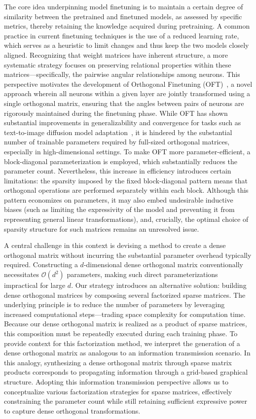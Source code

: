 The core idea underpinning model finetuning is to maintain a certain degree of similarity between the pretrained and finetuned models, as assessed by specific metrics, thereby retaining the knowledge acquired during pretraining. A common practice in current finetuning techniques is the use of a reduced learning rate, which serves as a heuristic to limit changes and thus keep the two models closely aligned. Recognizing that weight matrices have inherent structure, a more systematic strategy focuses on preserving relational properties within these matrices—specifically, the pairwise angular relationships among neurons. This perspective motivates the development of Orthogonal Finetuning (OFT)~\cite{qiu2023controlling}, a novel approach wherein all neurons within a given layer are jointly transformed using a single orthogonal matrix, ensuring that the angles between pairs of neurons are rigorously maintained during the finetuning phase. While OFT has shown substantial improvements in generalizability and convergence for tasks such as text-to-image diffusion model adaptation~\cite{qiu2023controlling}, it is hindered by the substantial number of trainable parameters required by full-sized orthogonal matrices, especially in high-dimensional settings. To make OFT more parameter-efficient, a block-diagonal parameterization is employed, which substantially reduces the parameter count. Nevertheless, this increase in efficiency introduces certain limitations: the sparsity imposed by the fixed block-diagonal pattern means that orthogonal operations are performed separately within each block. Although this pattern economizes on parameters, it may also embed undesirable inductive biases (such as limiting the expressivity of the model and preventing it from representing general linear transformations), and, crucially, the optimal choice of sparsity structure for such matrices remains an unresolved issue.

A central challenge in this context is devising a method to create a dense orthogonal matrix without incurring the substantial parameter overhead typically required. Constructing a $d$-dimensional dense orthogonal matrix conventionally necessitates $\mathcal{O}(d^2)$ parameters, making such direct parameterizations impractical for large $d$. Our strategy introduces an alternative solution: building dense orthogonal matrices by composing several factorized sparse matrices. The underlying principle is to reduce the number of parameters by leveraging increased computational steps—trading space complexity for computation time. Because our dense orthogonal matrix is realized as a product of sparse matrices, this composition must be repeatedly executed during each training phase. To provide context for this factorization method, we interpret the generation of a dense orthogonal matrix as analogous to an information transmission scenario. In this analogy, synthesizing a dense orthogonal matrix through sparse matrix products corresponds to propagating information through a grid-based graphical structure. Adopting this information transmission perspective allows us to conceptualize various factorization strategies for sparse matrices, effectively constraining the parameter count while still retaining sufficient expressive power to capture dense orthogonal transformations.

